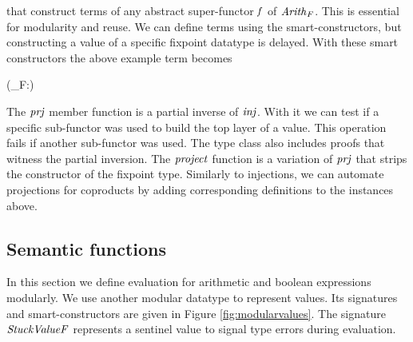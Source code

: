 that construct terms of any abstract super-functor \ensuremath{\Varid{f}} of
\ensuremath{\Varid{Arith}_F}. This is essential for modularity and reuse. We can define
terms using the smart-constructors, but constructing a value of a
specific fixpoint datatype is delayed. With these smart constructors
the above example term becomes
\begin{hscode}\SaveRestoreHook
{}%
%
%
\>[3]{}\mathbin{::}(_F\prec:)\Rightarrow {}\;\<[E]%
\\
\>[3]{}\mathrel{=}\;\;\<[E]%
\ColumnHook
\end{hscode}\resethooks

The \ensuremath{\Varid{prj}} member function is a partial inverse of \ensuremath{\Varid{inj}}. With it we
can test if a specific sub-functor was used to build the top layer of
a value. This operation fails if another sub-functor was used. The
type class also includes proofs that witness the partial
inversion. The \ensuremath{\Varid{project}} function is a variation of \ensuremath{\Varid{prj}} that strips
the constructor of the fixpoint type. Similarly to injections, we can
automate projections for coproducts by adding corresponding
definitions to the instances above.


\subsection{Semantic functions}

In this section we define evaluation for arithmetic and boolean
expressions modularly. We use another modular datatype to represent
values. Its signatures and smart-constructors are given in Figure
\ref{fig:modularvalues}. The signature \ensuremath{\Conid{StuckValueF}} represents a
sentinel value to signal type errors during evaluation.

